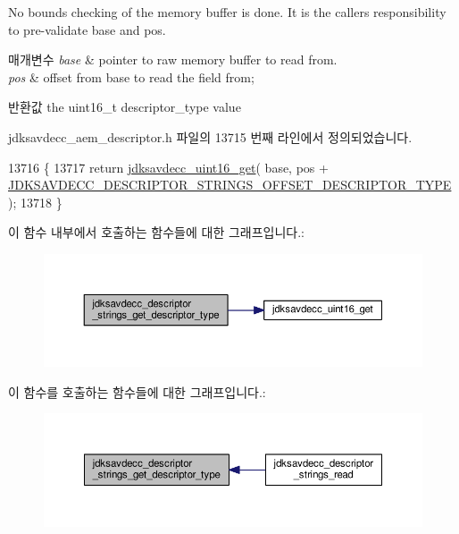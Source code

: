 No bounds checking of the memory buffer is done. It is the caller\textquotesingle{}s responsibility to pre-\/validate base and pos.


\begin{DoxyParams}{매개변수}
{\em base} & pointer to raw memory buffer to read from. \\
\hline
{\em pos} & offset from base to read the field from; \\
\hline
\end{DoxyParams}
\begin{DoxyReturn}{반환값}
the uint16\+\_\+t descriptor\+\_\+type value 
\end{DoxyReturn}


jdksavdecc\+\_\+aem\+\_\+descriptor.\+h 파일의 13715 번째 라인에서 정의되었습니다.


\begin{DoxyCode}
13716 \{
13717     \textcolor{keywordflow}{return} \hyperlink{group__endian_ga3fbbbc20be954aa61e039872965b0dc9}{jdksavdecc\_uint16\_get}( base, pos + 
      \hyperlink{group__descriptor__strings_gab1dc6ebdf66d887e60fa02f919e13546}{JDKSAVDECC\_DESCRIPTOR\_STRINGS\_OFFSET\_DESCRIPTOR\_TYPE} );
13718 \}
\end{DoxyCode}


이 함수 내부에서 호출하는 함수들에 대한 그래프입니다.\+:
\nopagebreak
\begin{figure}[H]
\begin{center}
\leavevmode
\includegraphics[width=350pt]{group__descriptor__strings_gaefaeb02e3e054cbf2e4978af56765514_cgraph}
\end{center}
\end{figure}




이 함수를 호출하는 함수들에 대한 그래프입니다.\+:
\nopagebreak
\begin{figure}[H]
\begin{center}
\leavevmode
\includegraphics[width=350pt]{group__descriptor__strings_gaefaeb02e3e054cbf2e4978af56765514_icgraph}
\end{center}
\end{figure}



